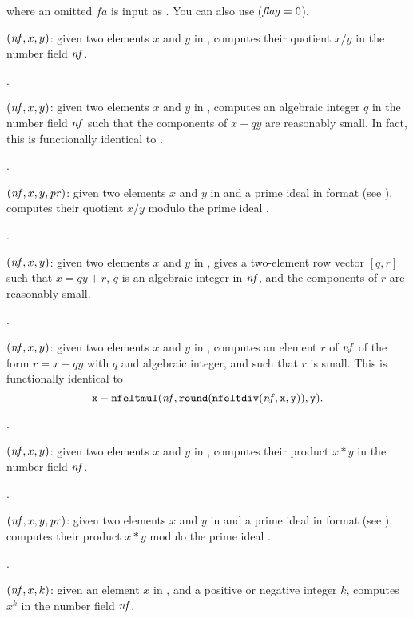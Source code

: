  where an omitted $fa$ is input as . You
can also use  ($\hbox{\it f\kern0pt lag\/}=0$).

$(\hbox{\it nf\/},x,y)$: given two elements $x$ and $y$ in
, computes their quotient $x/y$ in the number field $\hbox{\it nf\/}$.

.

$(\hbox{\it nf\/},x,y)$: given two elements $x$ and $y$ in
, computes an algebraic integer $q$ in the number field $\hbox{\it nf\/}$
such that the components of $x-qy$ are reasonably small. In fact, this is
functionally identical to .

.

$(\hbox{\it nf\/},x,y,\hbox{\it pr\/})$: given two elements $x$
and $y$ in  and  a prime ideal in  format (see
), computes their quotient $x / y$ modulo the prime ideal
.

.

$(\hbox{\it nf\/},x,y)$: given two elements $x$ and $y$ in
, gives a two-element row vector $[q,r]$ such that $x=qy+r$, $q$ is
an algebraic integer in $\hbox{\it nf\/}$, and the components of $r$ are
reasonably small.

.

$(\hbox{\it nf\/},x,y)$: given two elements $x$ and $y$ in
, computes an element $r$ of $\hbox{\it nf\/}$ of the form $r=x-qy$ with
$q$ and algebraic integer, and such that $r$ is small. This is functionally
identical to
$${\tt x - nfeltmul(\hbox{\it nf\/},round(nfeltdiv(\hbox{\it nf\/},x,y)),y)}.$$

.

$(\hbox{\it nf\/},x,y)$: given two elements $x$ and $y$ in
, computes their product $x*y$ in the number field $\hbox{\it nf\/}$.

.

$(\hbox{\it nf\/},x,y,\hbox{\it pr\/})$: given two elements $x$ and
$y$ in  and  a prime ideal in  format (see
), computes their product $x*y$ modulo the prime ideal
.

.

$(\hbox{\it nf\/},x,k)$: given an element $x$ in ,
and a positive or negative integer $k$, computes $x^k$ in the number field
$\hbox{\it nf\/}$.

